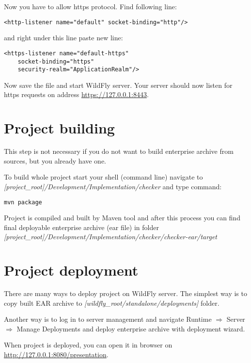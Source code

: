 \documentclass[12pt,a4paper]{article}
\begin{document}
Now you have to allow https protocol. Find following line:
\begin{lstlisting}
<http-listener name="default" socket-binding="http"/>
\end{lstlisting}
and right under this line paste new line:
\begin{lstlisting}
<https-listener name="default-https" 
	socket-binding="https" 
	security-realm="ApplicationRealm"/>
\end{lstlisting}

Now save the file and start WildFly server. Your server should now listen for https requests on address \url{https://127.0.0.1:8443}.

\section{Project building}
This step is not necessary if you do not want to build enterprise archive from sources, but you already have one.

To build whole project start your shell (command line) navigate to \\\textit{[project\_root]/Development/Implementation/checker} and type command:
\begin{lstlisting}
mvn package
\end{lstlisting}

Project is compiled and built by Maven tool and after this process you can find final deployable enterprise archive (ear file) in folder \\\textit{[project\_root]/Development/Implementation/checker/checker-ear/target}

\section{Project deployment}
There are many ways to deploy project on WildFly server. The simplest way is to copy built EAR archive to \textit{[wildfly\_root/standalone/deployments]} folder. 

Another way is to log in to server management and navigate Runtime $\Rightarrow$ Server $\Rightarrow$ Manage Deployments and deploy enterprise archive with deployment wizard.

When project is deployed, you can open it in browser on \\\url{http://127.0.0.1:8080/presentation}.
\end{document}
